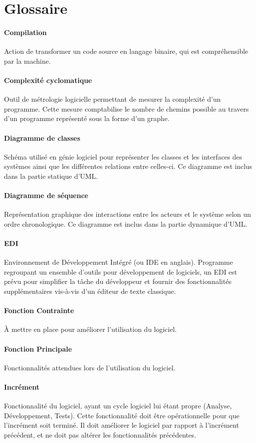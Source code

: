 \documentclass[12pt,a4paper,openany]{article}
\begin{document}
\section{Glossaire}
	\paragraph{Compilation} Action de transformer un code source en langage binaire, qui est compréhensible par la machine. 
	\paragraph{Complexité cyclomatique} Outil de métrologie logicielle permettant de mesurer la complexité d'un programme. Cette mesure comptabilise le nombre de chemins possible au travers d'un programme représenté sous la forme d'un graphe.
	\paragraph{Diagramme de classes} Schéma utilisé en génie logiciel pour représenter les classes et les interfaces des systèmes
	ainsi que les différentes relations entre celles-ci. Ce diagramme est inclus dans la partie statique d'UML.
	\paragraph{Diagramme de séquence} Représentation graphique des interactions entre les acteurs et le système selon un ordre 
	chronologique. Ce diagramme est inclus dans la partie dynamique d'UML.
	\paragraph{EDI} Environnement de Développement Intégré (ou IDE en anglais). Programme regroupant un ensemble d'outils pour développement de logiciels, un EDI
	est prévu pour simplifier la tâche du développeur et fournir des fonctionnalités supplémentaires vis-à-vis d'un éditeur de texte classique.
	\paragraph{Fonction Contrainte}
	À mettre en place pour améliorer l'utilisation du logiciel.
	\paragraph{Fonction Principale}
	Fonctionnalités attendues lors de l'utilisation du logiciel.
	\paragraph{Incrément} Fonctionnalité du logiciel, ayant un cycle logiciel lui étant propre (Analyse, Développement, Tests). Cette 
	fonctionnalité doit être opérationnelle pour que l'incrément soit terminé. Il doit améliorer le logiciel par rapport à l'incrément précédent, 
	et ne doit pas altérer les fonctionnalités précédentes.
\end{document}
